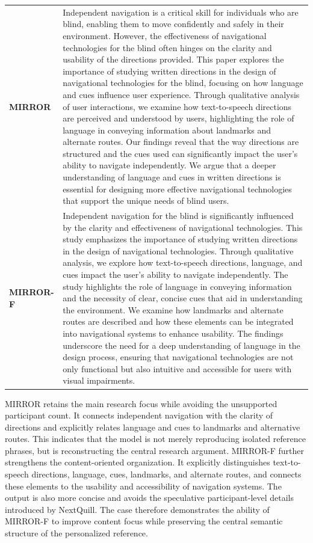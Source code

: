 \documentclass{article} %
\begin{document}
\begin{table}[t]
\begin{tabular}{p{}p{}}
\textbf{MIRROR}
&
Independent navigation is a critical skill for individuals who are blind, enabling them to move confidently and safely in their environment. However, the effectiveness of navigational technologies for the blind often hinges on the clarity and usability of the directions provided. This paper explores the importance of studying written directions in the design of navigational technologies for the blind, focusing on how language and cues influence user experience. Through qualitative analysis of user interactions, we examine how text-to-speech directions are perceived and understood by users, highlighting the role of language in conveying information about landmarks and alternate routes. Our findings reveal that the way directions are structured and the cues used can significantly impact the user's ability to navigate independently. We argue that a deeper understanding of language and cues in written directions is essential for designing more effective navigational technologies that support the unique needs of blind users. \\[2mm]

\textbf{MIRROR-F}
&
Independent navigation for the blind is significantly influenced by the clarity and effectiveness of navigational technologies. This study emphasizes the importance of studying written directions in the design of navigational technologies. Through qualitative analysis, we explore how text-to-speech directions, language, and cues impact the user's ability to navigate independently. The study highlights the role of language in conveying information and the necessity of clear, concise cues that aid in understanding the environment. We examine how landmarks and alternate routes are described and how these elements can be integrated into navigational systems to enhance usability. The findings underscore the need for a deep understanding of language in the design process, ensuring that navigational technologies are not only functional but also intuitive and accessible for users with visual impairments. \\
\bottomrule
\end{tabular}
\end{table}

MIRROR retains the main research focus while avoiding the unsupported participant count. It connects independent navigation with the clarity of directions and explicitly relates language and cues to landmarks and alternative routes. This indicates that the model is not merely reproducing isolated reference phrases, but is reconstructing the central research argument. MIRROR-F further strengthens the content-oriented organization. It explicitly distinguishes text-to-speech directions, language, cues, landmarks, and alternate routes, and connects these elements to the usability and accessibility of navigation systems. The output is also more concise and avoids the speculative participant-level details introduced by NextQuill. The case therefore demonstrates the ability of MIRROR-F to improve content focus while preserving the central semantic structure of the personalized reference.
\end{document}
